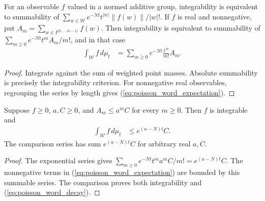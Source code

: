 \begin{lemma}
\label{lem:poisson_word_expectation}
\leanok
{}
For an observable $f$ valued in a normed additive group, integrability is
equivalent to summability of
$\sum_{w\in\mathcal W}e^{-Nt}t^{|w|}\|f(w)\|/|w|!$.
If $f$ is real and nonnegative, put
$A_m=\sum_{w\in I^{\{0,\ldots,m-1\}}}f(w)$.
Then integrability is equivalent to summability of
$\sum_{m\geq0}e^{-Nt}t^m A_m/m!$, and in that case
\begin{align}
 \int_{\mathcal W} f\,d\mu_t
   &=\sum_{m\geq0}e^{-Nt}\frac{t^m}{m!}A_m.
 \label{eq:poisson_word_expectation}
\end{align}
\end{lemma}
\begin{proof}
\leanok
Integrate against the sum of weighted point masses.  Absolute summability
is precisely the integrability criterion.  For nonnegative real observables,
regrouping the series by length gives
(\ref{eq:poisson_word_expectation}).
\end{proof}

\begin{theorem}
\label{thm:poisson_word_decay}
\leanok
{}
Suppose $f\geq0$, $a,C\geq0$, and $A_m\leq a^m C$ for every $m\geq0$.
Then $f$ is integrable and
\begin{align}
 \int_{\mathcal W} f\,d\mu_t
   &\leq e^{(a-N)t}C.
 \label{eq:poisson_word_decay}
\end{align}
The comparison series has sum $e^{(a-N)t}C$ for arbitrary real $a,C$.
\end{theorem}
\begin{proof}
\leanok
{}
The exponential series gives
$\sum_{m\geq0}e^{-Nt}t^m a^m C/m!=e^{(a-N)t}C$.
The nonnegative terms in (\ref{eq:poisson_word_expectation}) are bounded by
this summable series.  The comparison proves both integrability and
(\ref{eq:poisson_word_decay}).
\end{proof}
